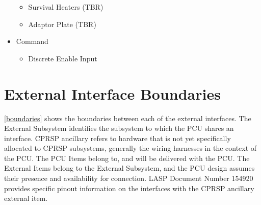 \begin{itemize}
\begin{itemize}
\item{} Survival Heaters (TBR\label{tbx_2})

\item{} Adaptor Plate (TBR\label{tbx_3})

\end{itemize}

\item{} Command

\begin{itemize}
\item{} Discrete Enable Input

\end{itemize}

\end{itemize}

\section{External Interface Boundaries}
\label{externalinterfaceboundaries}

\autoref{boundaries} shows the boundaries between each of the external interfaces. The External Subsystem identifies the subsystem to which the \gls{PCU} shares an interface. \gls{CPRSP} ancillary refers to hardware that is not yet specifically allocated to \gls{CPRSP} subsystems, generally the wiring harnesses in the context of the \gls{PCU}. The \gls{PCU} Items belong to, and will be delivered with the \gls{PCU}. The External Items belong to the External Subsystem, and the \gls{PCU} design assumes their presence and availability for connection. \gls{LASP} Document Number 154920 provides specific pinout information on the interfaces with the \gls{CPRSP} ancillary external item.




